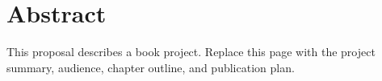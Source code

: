 \chapter*{Abstract}
This proposal describes a book project. Replace this page with the project
summary, audience, chapter outline, and publication plan.
